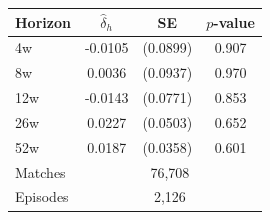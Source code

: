\begin{tabular}{lccc}
\toprule
Horizon & $\hat{\delta}_h$ & SE & $p$-value \\
\midrule
4w & -0.0105 & (0.0899) & 0.907 \\
8w & 0.0036 & (0.0937) & 0.970 \\
12w & -0.0143 & (0.0771) & 0.853 \\
26w & 0.0227 & (0.0503) & 0.652 \\
52w & 0.0187 & (0.0358) & 0.601 \\
\midrule
Matches & \multicolumn{3}{c}{76,708} \\
Episodes & \multicolumn{3}{c}{2,126} \\
\bottomrule
\end{tabular}
